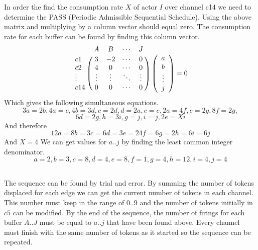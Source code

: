 \documentclass{article}
\begin{document}
In order the find the consumption rate $X$ of actor $I$ over channel c14 we need to determine the PASS (Periodic Admissible Sequential Schedule). Using the above matrix and multiplying by a column vector should equal zero. The consumption rate for each buffer can be found by finding this column vector.
\[
\bordermatrix{~ & A & B & \cdots & J \cr
              c1 & 3 & -2 & \cdots & 0 \cr
              c2 & 4 & 0 & \cdots & 0 \cr
              \vdots & \vdots & \vdots & \ddots & \vdots \cr
              c14 & 0 & 0 & \cdots & 0 \cr}
    \left( \begin{array}{ccc}
     a \\
     b \\
     \vdots \\
     j
    \end{array} \right) = 0
\]
Which gives the following simultaneous equations.
\[3a = 2b, 4a = c, 4b = 3d, c = 2d, d = 2a, c = e, 2a = 4f, e = 2g, 8f = 2g,\]
\[6d = 2g, h = 3i, g = j, i = j, 2e = Xi\]
And therefore
\[12a = 8b = 3c = 6d = 3e = 24f = 6g = 2h = 6i = 6j\]
And $X = 4$
We can get values for $a..j$ by finding the least common integer denominator.
\[a = 2, b = 3, c = 8, d = 4, e = 8, f = 1, g = 4, h = 12, i = 4, j = 4\]

\subsection{}

The sequence can be found by trial and error. By summing the number of tokens displaced for each edge we can get the current number of tokens in each channel. This number must keep in the range of 0..9 and the number of tokens initially in $c5$ can be modified. By the end of the sequence, the number of firings for each buffer $A..J$ must be equal to $a..j$ that have been found above. Every channel must finish with the same number of tokens as it started so the sequence can be repeated.
\end{document}
